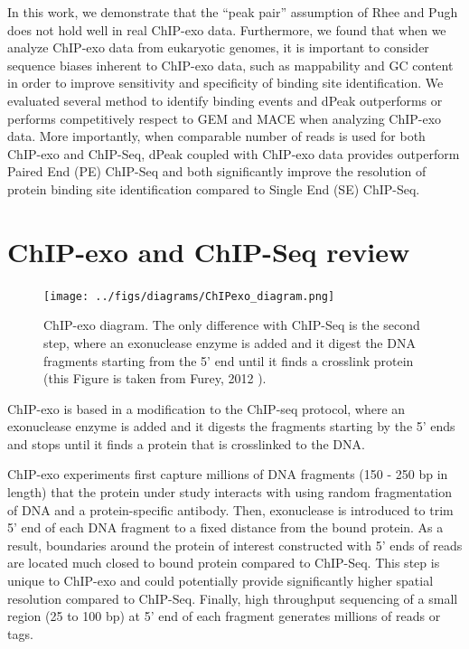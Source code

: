 \documentclass[11pt]{article}\usepackage[]{graphicx}\usepackage[]{color}
\begin{document}
In this work, we demonstrate that the ``peak pair'' assumption of Rhee
and Pugh \cite{exo1} does not hold well in real ChIP-exo
data. Furthermore, we found that when we analyze ChIP-exo data from
eukaryotic genomes, it is important to consider sequence biases
inherent to ChIP-exo data, such as mappability and GC content in order
to improve sensitivity and specificity of binding site
identification. We evaluated several method to identify binding events
and dPeak outperforms or performs competitively respect to GEM and
MACE when analyzing ChIP-exo data. More importantly, when comparable
number of reads is used for both ChIP-exo and ChIP-Seq, dPeak coupled
with ChIP-exo data provides outperform Paired End (PE) ChIP-Seq and
both significantly improve the resolution of protein binding site
identification compared to Single End (SE) ChIP-Seq.

\section{ChIP-exo and ChIP-Seq review}
\label{sec:exo}

\begin{figure}
\centering
\texttt{[image: ../figs/diagrams/ChIPexo\_diagram.png]}
\caption{ChIP-exo diagram. The only difference with ChIP-Seq is the
  second step, where an exonuclease enzyme is added and it digest the
  DNA fragments starting from the 5' end until it finds a crosslink
  protein (this Figure is taken from Furey, 2012 \cite{chipbeyond}).}
\label{fig:exo}
\end{figure}

ChIP-exo is based in a modification to the ChIP-seq protocol, where an
exonuclease enzyme is added and it digests the fragments starting by
the 5' ends and stops until it finds a protein that is crosslinked to
the DNA.

ChIP-exo experiments first capture millions of DNA fragments (150 -
250 bp in length) that the protein under study interacts with using
random fragmentation of DNA and a protein-specific antibody. Then,
exonuclease is introduced to trim 5' end of each DNA fragment to a
fixed distance from the bound protein. As a result, boundaries around
the protein of interest constructed with 5' ends of reads are located
much closed to bound protein compared to ChIP-Seq. This step is unique
to ChIP-exo and could potentially provide significantly higher spatial
resolution compared to ChIP-Seq. Finally, high throughput sequencing
of a small region (25 to 100 bp) at 5' end of each fragment generates
millions of reads or tags.
\end{document}
